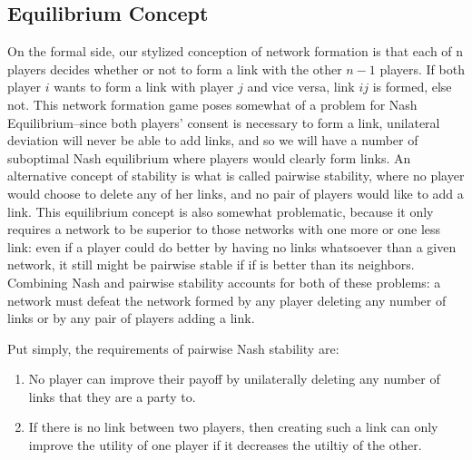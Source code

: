 \documentclass[12pt,onesided,fullpage]{amsart}
\begin{document}
\subsection{Equilibrium Concept}
On the formal side, our stylized conception of network formation is that each of n players decides whether or not to form a link with the other $n-1$ players. If both player $i$ wants to form a link with player $j$ and vice versa, link $ij$ is formed, else not. This network formation game poses somewhat of a problem for Nash Equilibrium--since both players' consent is necessary to form a link, unilateral deviation will never be able to add links, and so we will have a number of suboptimal Nash equilibrium where players would clearly form links. An alternative concept of stability is what is called pairwise stability, where no player would choose to delete any of her links, and no pair of players would like to add a link. This equilibrium concept is also somewhat problematic, because it only requires a network to be superior to those networks with one more or one less link: even if a player could do better by having no links whatsoever than a given network, it still might be pairwise stable if if is better than its neighbors. Combining Nash and pairwise stability accounts for both of these problems: a network must defeat the network formed by any player deleting any number of links or by any pair of players adding a link.

Put simply, the requirements of pairwise Nash stability are:
\begin{enumerate}
\item No player can improve their payoff by unilaterally deleting any number of links that they are a party to.
\item If there is no link between two players, then creating such a link can only improve the utility of one player if it decreases the utiltiy of the other.
\end{enumerate}
\end{document}
